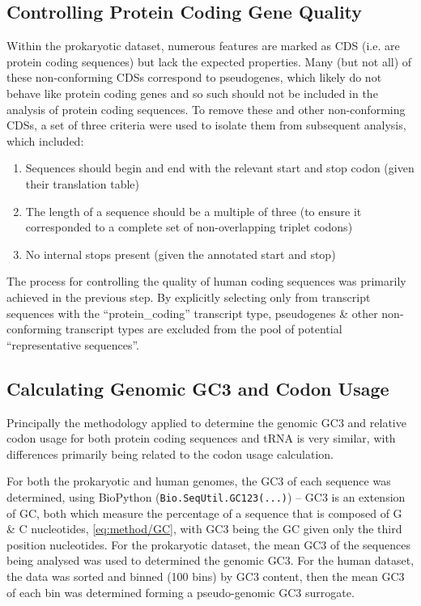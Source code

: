 \documentclass[../main.tex]{subfile}
\begin{document}
    \subsection{Controlling Protein Coding Gene Quality}
        Within the prokaryotic dataset, numerous features are marked as CDS (i.e. are protein coding sequences) but lack the expected properties. Many (but not all) of these non-conforming CDSs correspond to pseudogenes, which likely do not behave like protein coding genes and so such should not be included in the analysis of protein coding sequences. To remove these and other non-conforming CDSs, a set of three criteria were used to isolate them from subsequent analysis, which included:
        \begin{enumerate}
            \item Sequences should begin and end with the relevant start and stop codon (given their translation table)
            \item The length of a sequence should be a multiple of three (to ensure it corresponded to a complete set of non-overlapping triplet codons)
            \item No internal stops present (given the annotated start and stop)
        \end{enumerate}

        The process for controlling the quality of human coding sequences was primarily achieved in the previous step. By explicitly selecting only from transcript sequences with the ``protein_coding'' transcript type, pseudogenes \& other non-conforming transcript types are excluded from the pool of potential ``representative sequences''.

    \subsection{Calculating Genomic GC3 and Codon Usage}
        Principally the methodology applied to determine the genomic GC3 and relative codon usage for both protein coding sequences and tRNA is very similar, with differences primarily being related to the codon usage calculation.

        For both the prokaryotic and human genomes, the GC3 of each sequence was determined, using BioPython (\texttt{Bio.SeqUtil.GC123(...)}) -- GC3 is an extension of GC, both which measure the percentage of a sequence that is composed of G \& C nucleotides, \cref{eq:method/GC}, with GC3 being the GC given only the third position nucleotides. For the prokaryotic dataset, the mean GC3 of the sequences being analysed was used to determined the genomic GC3. For the human dataset, the data was sorted and binned (100 bins) by GC3 content, then the mean GC3 of each bin was determined forming a pseudo-genomic GC3 surrogate.
\end{document}
